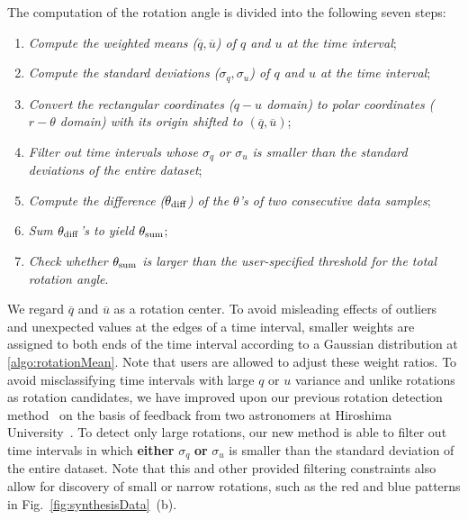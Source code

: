 The computation of the rotation angle is divided into the following seven steps:
\begin{enumerate}[nosep, label=\textsl{Step \arabic*}:, ref=\textsl{Step \arabic*}, align=parleft, leftmargin=*]
    \item \textsl{Compute the weighted means ($\overline{q}, \overline{u}$) of $q$ and $u$ at the time interval};\label{algo:rotationMean}
    \item \textsl{Compute the standard deviations ($\sigma_{q}, \sigma_{u}$) of $q$ and $u$ at the time interval}; \label{algo:rotationStd}
    \item \textsl{Convert the rectangular coordinates ($q-u$ domain) to polar coordinates ($r - \theta$ domain) with its origin shifted to $(\overline{q}, \overline{u})$}; \label{algo:rotationPolar}
    \item \textsl{Filter out time intervals whose $\sigma_{q}$ or $\sigma_{u}$ is smaller than the standard deviations of the entire dataset}; \label{algo:rotationFilter}
    \item \textsl{Compute the difference ($\theta_{\rm diff}$) of the $\theta$'s of two consecutive data samples}; \label{algo:rotationDiff}
    \item \textsl{Sum $\theta_{\rm diff}$'s to yield $\theta_{\rm sum}$}; \label{algo:rotationSum}
    \item \textsl{Check whether $\theta_{\rm sum}$ is larger than the user-specified threshold for the total rotation angle}. \label{algo:rotationThreshold}
\end{enumerate}
We regard $\overline{q}$ and $\overline{u}$ as a rotation center. 
To avoid misleading effects of outliers and unexpected values at the edges of a time interval,
smaller weights are assigned to both ends of the time interval according to a Gaussian distribution at \ref{algo:rotationMean}.
Note that users are allowed to adjust these weight ratios.
To avoid misclassifying time intervals with large $q$ or $u$ variance and unlike rotations as rotation candidates,
we have improved upon our previous rotation detection method~\cite{Sawada2018} on the basis of feedback from two astronomers at Hiroshima University~\cite{Huang2019}.
To detect only large rotations, 
our new method is able to filter out time intervals in which \textbf{either} $\sigma_{q}$ \textbf{or} $ \sigma_{u}$ is smaller than the standard deviation of the entire dataset. 
Note that this and other provided filtering constraints also allow for discovery of small or narrow rotations, such as the red and blue patterns in Fig.~\ref{fig:synthesisData}~(b).
